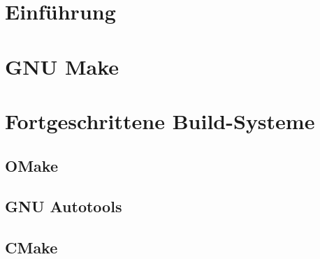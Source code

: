 \documentclass[a4paper,12pt]{report}
\author{Peter Brantsch}
\date{29. April 2014}
\begin{document}
	
	\clearpage
	\tableofcontents

	\pagebreak
	\addtocounter{page}{2}


	\chapter{Einführung}
	

	\chapter{GNU Make}
		
		
		

	\chapter{Fortgeschrittene Build-Systeme}
		\label{chapter:advancedbs}
		\section{OMake}
		\section{GNU Autotools}
		\section{CMake}

	\pagebreak
	\begin{minipage}{\textwidth}
		
	\end{minipage}
	\begin{minipage}{\textwidth}
		
	\end{minipage}
	\begin{minipage}{\textwidth}
		
	\end{minipage}
	\begin{minipage}{\textwidth}
		
	\end{minipage}
\end{document}
